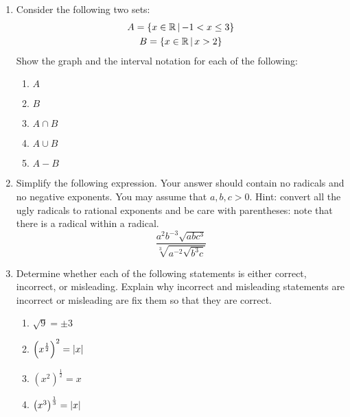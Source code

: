 \documentclass[letterpaper,12pt,fleqn]{article}
\begin{document}
\begin{enumerate}
\item Consider the following two sets:
  \begin{gather*}
    A=\left\{{x\in\mathbb{R}}\,\middle|\,{-1<x\le3}\right\} \\
    B=\left\{{x\in\mathbb{R}}\,\middle|\,{x>2}\right\}
  \end{gather*}
  Show the graph and the interval notation for each of the following:
  \begin{enumerate}
  \item \(A\)
  \item \(B\)
  \item \(A\cap B\)
  \item \(A\cup B\)
  \item \(A-B\)
  \end{enumerate}

\item Simplify the following expression. Your answer should contain no radicals and no negative exponents. You may
  assume that $a,b,c>0$.  Hint: convert all the ugly radicals to rational exponents and be care with parentheses: note
  that there is a radical within a radical.
  \[\frac{a^2b^{-3}\sqrt{abc^3}}{\sqrt[3]{a^{-2}\sqrt{b^3c}}}\]

\item Determine whether each of the following statements is either correct, incorrect, or misleading.  Explain why
  incorrect and misleading statements are incorrect or misleading are fix them so that they are correct.
  \begin{enumerate}
  \item \(\sqrt{9}=\pm3\)
  \item \(\left(x^{\frac{1}{2}}\right)^2=\lvert x\rvert\)
  \item \(\left(x^2\right)^{\frac{1}{2}}=x\)
  \item \(\left(x^3\right)^{\frac{1}{3}}=\lvert x\rvert\)
  \end{enumerate}

\end{enumerate}
\end{document}
